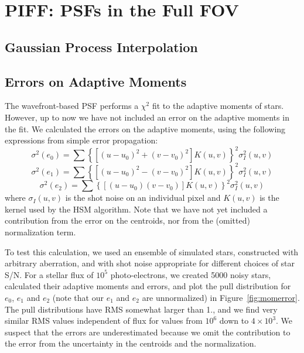 \documentclass[\docopts]{\docclass}
\begin{document}

\section{PIFF: PSFs in the Full FOV}


\subsection{Gaussian Process Interpolation}


\subsection{Errors on Adaptive Moments}

The wavefront-based PSF performs a $\chi^2$ fit to the adaptive moments of stars.  However, up to now we have not included an error on the adaptive moments in the fit.  We calculated the errors on the adaptive moments, using the following expressions from simple error propagation:
$$  \sigma^2(e_0) = \sum \left\{ \left[ (u-u_0)^2 + (v-v_0)^2  \right] K(u,v) \right\}^2 \sigma_{I}^2(u,v) $$
$$  \sigma^2(e_1) = \sum \left\{ \left[ (u-u_0)^2 - (v-v_0)^2  \right] K(u,v) \right\}^2 \sigma_{I}^2(u,v) $$
$$  \sigma^2(e_2) = \sum \left\{ \left[ (u-u_0)  (v-v_0)  \right] K(u,v) \right\}^2 \sigma_{I}^2(u,v) $$
where $\sigma_{I}(u,v)$ is the shot noise on an individual pixel and $K(u,v)$ is the kernel used by the HSM algorithm. Note that we have not yet included a contribution from the error on the centroids, nor from the (omitted) normalization term. 

To test this calculation, we used an ensemble of simulated stars, constructed with arbitrary aberration, and with shot noise appropriate for different choices of star S/N. For a stellar flux of $10^5$ photo-electrons, we created 5000 noisy stars, calculated their adaptive moments and errors, and plot the pull distribution for $e_0$, $e_1$ and $e_2$ (note that our $e_1$ and $e_2$ are unnormalized) in Figure~\ref{fig:momerror}.  The pull distributions have RMS  somewhat larger than 1., and we find very similar RMS values independent of flux for values from $10^6$ down to $4\times10^3$.  We suspect that the errors are underestimated because we omit the contribution to the error from the uncertainty in the centroids and the normalization.  
\end{document}
